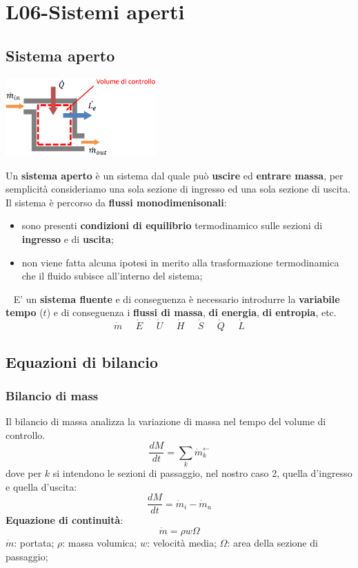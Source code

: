 \section{L06-Sistemi aperti}
\subsection{Sistema aperto}
\begin{center}
    \includegraphics[height=3cm]{../L06/img1.PNG}
\end{center}
Un \textbf{sistema aperto} è un sistema dal quale può \textbf{uscire} ed \textbf{entrare massa}, per semplicità consideriamo una sola sezione di ingresso ed una sola sezione di uscita.\newline
\newline
Il sistema è percorso da \textbf{flussi monodimenisonali}:
\begin{itemize}
    \item sono presenti \textbf{condizioni di equilibrio} termodinamico sulle sezioni di \textbf{ingresso} e di \textbf{uscita};
    \item non viene fatta alcuna ipotesi in merito alla trasformazione termodinamica che il fluido subisce all'interno del sistema;
\end{itemize}
\ \newline
E' un \textbf{sistema fluente} e di conseguenza è necessario introdurre la \textbf{variabile tempo} ($t$) e di conseguenza i \textbf{flussi di massa}, \textbf{di energia}, \textbf{di entropia}, etc.
\[
    \dot{m} \;\;\;\;\; \dot{E}\;\;\;\;\;\dot{U}\;\;\;\;\;\dot{H}\;\;\;\;\;\dot{S}\;\;\;\;\;\dot{Q}\;\;\;\;\;\dot{L}
\]
\subsection{Equazioni di bilancio}
\subsubsection{Bilancio di mass}
Il bilancio di massa analizza la variazione di massa nel tempo del volume di controllo.
\[
    \frac{dM}{dt} = \sum_{k} \dot{m}_k^\leftarrow
\]
dove per $k$ si intendono le sezioni di passaggio, nel nostro caso 2, quella d'ingresso e quella d'uscita:
\[
    \frac{dM}{dt} = \dot{m}_i - \dot{m}_u
\]
\textbf{Equazione di continuità}:
\[
    \dot{m}=\rho w \Omega
\]
$\dot{m}$: portata;\newline
$\rho$: massa volumica;\newline
$w$: velocità media;\newline
$\Omega$: area della sezione di passaggio;
